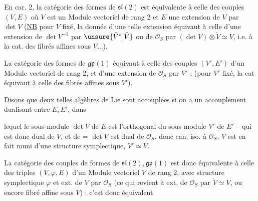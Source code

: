 En car. 2, la catégorie des formes de $\mathfrak{sl}(2)$ est équivalente à celle des couples $(V,E)$ où $V$ est un Module vectoriel de rang 2 et $E$ une extension de  $V$ par $\det V$ (\uline{NB} pour $V$ fixé, la donnée d'une telle extension équivaut à celle d'une  extension de $\det V^{-1}$ par $\unsure{\check V^*|\check V}$ ou de $\mathscr O_S$ par $(\det V)\otimes\check V\simeq V$, i.e. à la cat. des fibrés affines sous $V\ldots$).

La catégorie des formes de $\mathfrak{gp}(1)$ équivaut à celle des  couples $(V',E')$ d'un Module vectoriel  de rang 2, et d'une extension  de $\mathscr O_S$ par $V'$ ; (pour $V'$ fixé, la cat équivaut à celle des fibrés affines sous $V'$).

Disons que deux telles algèbres de Lie  sont accouplées si on a un accouplement dualisant entre $E,E'$, dans


lequel le sous-module $\det V$ de $E$ est l'orthogonal du sous module $V'$ de $E'$ -- qui est donc  dual de $V$, et de = $\det V$ est dual de $\mathscr O_S$, donc can. iso. à $\mathscr O_S$.  $V$ est en fait muni d'une structure symplectique,   $V'\simeq V$.

La catégorie des couples  de formes de $\mathfrak{sl}(2),\mathfrak{gp}(1)$ est donc équivalente à celle des triples $(V,\varphi,E)$ d'un Module vectoriel $V$ de rang 2, avec structure symplectique $\varphi$ et ext. de $V$ par $\mathscr O_S$ (ce qui revient à ext. de $\mathscr O_S$ par $\check V\simeq V$, ou encore fibré affine sous $V$) : c'est donc équivalent

